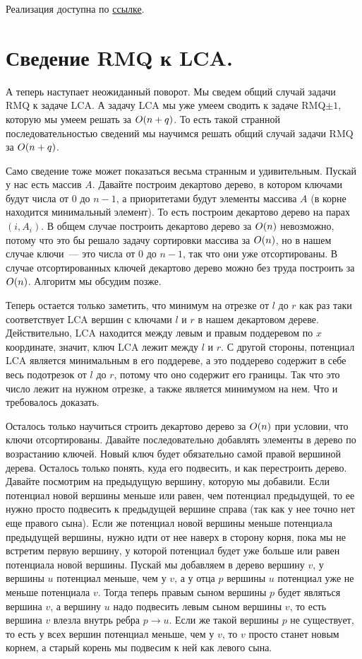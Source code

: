 Реализация доступна по \href{https://pastebin.com/v3Q5YZBV}{ссылке}.



\section{Сведение RMQ к LCA.}

А теперь наступает неожиданный поворот. Мы сведем общий случай задачи RMQ к задаче LCA. А задачу LCA мы уже умеем сводить к задаче RMQ$\pm 1$, которую мы умеем решать за $O(n + q)$. То есть такой странной последовательностью сведений мы научимся решать общий случай задачи RMQ за $O(n + q)$.

Само сведение тоже может показаться весьма странным и удивительным. Пускай у нас есть массив $A$. Давайте построим декартово дерево, в котором ключами будут числа от $0$ до $n - 1$, а приоритетами будут элементы массива $A$ (в корне находится минимальный элемент). То есть построим декартово дерево на парах $(i, A_i)$. В общем случае построить декартово дерево за $O(n)$ невозможно, потому что это бы решало задачу сортировки массива за $O(n)$, но в нашем случае ключи~--- это числа от $0$ до $n - 1$, так что они уже отсортированы. В случае отсортированных ключей декартово дерево можно без труда построить за $O(n)$. Алгоритм мы обсудим позже.

Теперь остается только заметить, что минимум на отрезке от $l$ до $r$ как раз таки соответствует LCA вершин с ключами $l$ и $r$ в нашем декартовом дереве. Действительно, LCA находится между левым и правым поддеревом по $x$ координате, значит, ключ LCA лежит между $l$ и $r$. С другой стороны, потенциал LCA является минимальным в его поддереве, а это поддерево содержит в себе весь подотрезок от $l$ до $r$, потому что оно содержит его границы. Так что это число лежит на нужном отрезке, а также является минимумом на нем. Что и требовалось доказать.

Осталось только научиться строить декартово дерево за $O(n)$ при условии, что ключи отсортированы. Давайте последовательно добавлять элементы в дерево по возрастанию ключей. Новый ключ будет обязательно самой правой вершиной дерева. Осталось только понять, куда его подвесить, и как перестроить дерево. Давайте посмотрим на предыдущую вершину, которую мы добавили. Если потенциал новой вершины меньше или равен, чем потенциал предыдущей, то ее нужно просто подвесить к предыдущей вершине справа (так как у нее точно нет еще правого сына). Если же потенциал новой вершины меньше потенциала предыдущей вершины, нужно идти от нее наверх в сторону корня, пока мы не встретим первую вершину, у которой потенциал будет уже больше или равен потенциала новой вершины. Пускай мы добавляем в дерево вершину $v$, у вершины $u$ потенциал меньше, чем у $v$, а у отца $p$ вершины $u$ потенциал уже не меньше потенциала $v$. Тогда теперь правым сыном вершины $p$ будет являться вершина $v$, а вершину $u$ надо подвесить левым сыном вершины $v$, то есть вершина $v$ влезла внутрь ребра $p \to u$. Если же такой вершины $p$ не существует, то есть у всех вершин потенциал меньше, чем у $v$, то $v$ просто станет новым корнем, а старый корень мы подвесим к ней как левого сына.

